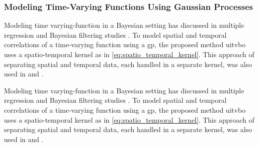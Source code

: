 \subsubsection{Modeling Time-Varying Functions Using Gaussian Processes}

Modeling time varying-function in a Bayesian setting has discussed in multiple regression and Bayesian filtering studies \cite{Vaerenbergh_2012}\cite{Vaerenbergh2_2012}\cite{Sarkka_2013}\cite{Carron_2016}.
To model spatial and temporal correlations of a time-varying function using a \gls{gp}, the proposed method \gls{uitvbo} uses a spatio-temporal kernel as in \eqref{eq:spatio_temporal_kernel}. This approach of separating spatial and temporal data, each handled in a separate kernel, was also used in \textcite{Sarkka_2013} and \textcite{Carron_2016}.

Modeling time varying-function in a Bayesian setting has discussed in multiple regression and Bayesian filtering studies \cite{Vaerenbergh_2012}\cite{Vaerenbergh2_2012}\cite{Sarkka_2013}\cite{Carron_2016}.
To model spatial and temporal correlations of a time-varying function using a \gls{gp}, the proposed method \gls{uitvbo} uses a spatio-temporal kernel as in \eqref{eq:spatio_temporal_kernel}. This approach of separating spatial and temporal data, each handled in a separate kernel, was also used in \textcite{Sarkka_2013} and \textcite{Carron_2016}.

